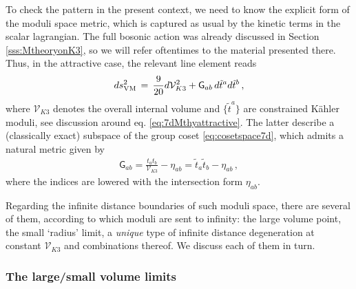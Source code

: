 To check the pattern in the present context, we need to know the explicit form of the moduli space metric, which is captured as usual by the kinetic terms in the scalar lagrangian. The full bosonic action was already discussed in Section \ref{sss:MtheoryonK3}, so we will refer oftentimes to the material presented there. Thus, in the attractive case, the relevant line element reads
%
\begin{equation}\label{eq:7dMthymetric}
	\begin{aligned}
		ds_{\rm VM}^2\, = \, \frac{9}{20} d\mathcal{V}_{K3}^2 + \mathsf{G}_{a b}\, d\tilde{t}^a d \tilde{t}^b\, ,
	\end{aligned}
\end{equation}
%
where $\mathcal{V}_{K3}$ denotes the overall internal volume and $\{ \tilde{t}^a\}$ are constrained K\"ahler moduli, see discussion around eq. \eqref{eq:7dMthyattractive}. The latter describe a (classically exact) subspace of the group coset \eqref{eq:cosetspace7d}, which admits a natural metric given by
%
\begin{equation}\label{eq:7dmodspacemetricpattern}
	\begin{aligned}
		\mathsf{G}_{a b} = \frac{t_a t_b}{\mathcal{V}_{K3}}- \eta_{a b} = \tilde{t}_a \tilde{t}_b -\eta_{a b}\, ,
	\end{aligned}
\end{equation}
%
where the indices are lowered with the intersection form $\eta_{a b}$. 
	
Regarding the infinite distance boundaries of such moduli space, there are several of them, according to which moduli are sent to infinity: the large volume point, the small `radius' limit, a \emph{unique} type of infinite distance degeneration at constant $\mathcal{V}_{K3}$ and combinations thereof. We discuss each of them in turn.
	
\subsubsection*{The large/small volume limits}
	
